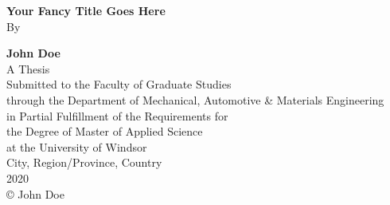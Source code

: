 \newpage %
\pagestyle{empty} %
{\centering
	\vspace{4cm}
	{\large\bfseries Your Fancy Title Goes Here\\}
	\vspace{1cm}
	By\par
	\vspace{1cm}
	{\bfseries John Doe\\}
	\vfill
	A Thesis \\
	Submitted to the Faculty of Graduate Studies \\
	through the Department of Mechanical, Automotive \& Materials Engineering\\
	in Partial Fulfillment of the Requirements for\\
	the Degree of Master of Applied Science\\
	at the University of Windsor\\
	\vfill
	City, Region/Province, Country\\
	\vspace{1cm}
	2020\\
	\vspace{1cm}
	\copyright {} John Doe\\
}
